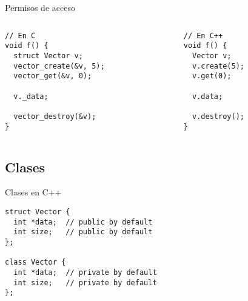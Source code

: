 \begin{frame}[fragile]{Permisos de acceso}{}
   \begin{columns}[t]
      \begin{column}{.4\linewidth}
         \begin{lstlisting}[style=normal,firstnumber=14]
// En C
void f() {
  struct Vector v;
  vector_create(&v, 5);
  vector_get(&v, 0);

  v._data;

  vector_destroy(&v);
}
         \end{lstlisting}
     \end{column}
      \begin{column}{.4\linewidth}
        \begin{lstlisting}[style=normal,firstnumber=14,linebackgroundcolor={%
                 \btLstHLR<1>{20}%
         }]
// En C++
void f() {
  Vector v;
  v.create(5);
  v.get(0);

  v.data;

  v.destroy();
}
        \end{lstlisting}
    \end{column}
\end{columns}
\end{frame}

\subsection{Clases}
\begin{frame}[fragile]{Clases en C++}
        \begin{lstlisting}[style=normal,firstnumber=1]
struct Vector {
  int *data;  // public by default
  int size;   // public by default
};

class Vector {
  int *data;  // private by default
  int size;   // private by default
};
        \end{lstlisting}
\end{frame}


